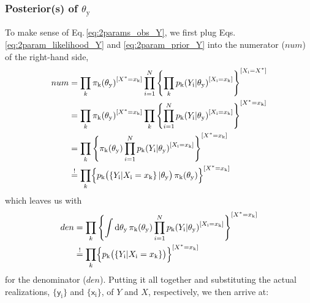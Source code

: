 \documentclass[]{report}
\begin{document}
\subsubsection{Posterior(s) of $\theta_\mathrm{y}$}
To make sense of Eq.\,\ref{eq:2params_obs_Y}, we first plug Eqs.\,\ref{eq:2param_likelihood_Y} and \ref{eq:2param_prior_Y} into the numerator ($num$) of the right-hand side,
\begin{align}
num 
&=
\prod_{k}
	{
		\pi_\mathrm{k}( \theta_\mathrm{y} )
	}
    ^
    {
		[ X^* = x_\mathrm{k} ]
	}
\prod_{i=1}^{N}
	\left\{
		\prod_{k}
			{
				p_\mathrm{k}( Y_\mathrm{i} | \theta_\mathrm{y} )
			}
		    ^
		    {
				[ X_\mathrm{i} = x_\mathrm{k} ]
			}
	\right\}
	^
	{
		[ X_\mathrm{i} = X^* ]
	}
\nonumber \\
&=
\prod_{k}
	{
		\pi_\mathrm{k}( \theta_\mathrm{y} )
	}
    ^
    {
		[ X^* = x_\mathrm{k} ]
	}
\prod_{k}
	\left\{
		\prod_{i=1}^{N}
			{
				p_\mathrm{k}( Y_\mathrm{i} | \theta_\mathrm{y} )
			}
			^
			{
				[ X_\mathrm{i} = x_\mathrm{k} ]
			}
	\right\}
	^
	{
		[ X^* = x_\mathrm{k} ]
	}
\nonumber \\
&=
\prod_{k}
	\left\{
		\pi_\mathrm{k}( \theta_\mathrm{y} )
		\prod_{i=1}^{N}
			{
				p_\mathrm{k}( Y_\mathrm{i} | \theta_\mathrm{y} )
			}
			^
			{
				[ X_\mathrm{i} = x_\mathrm{k} ]
			}
	\right\}
	^
	{
		[ X^* = x_\mathrm{k} ]
	}
\nonumber \\
&\stackrel{!}{=}
\prod_{k}
	\Bigl\{
		p_\mathrm{k}
			\bigl(
				\left\{ 
					Y_\mathrm{i} | 
					X_\mathrm{i} = x_\mathrm{k} 
				\right\} |
				\theta_\mathrm{y}
			\bigr) \,
		\pi_\mathrm{k}( \theta_\mathrm{y} )
	\Bigr\}
	^
	{
		[ X^* = x_\mathrm{k} ]
	}
\end{align}
which leaves us with
\begin{align}
den 
&= 
\prod_{k}
	\left\{
		\int \mathrm{d}\theta_\mathrm{y} \,
			\pi_\mathrm{k}( \theta_\mathrm{y} )
			\prod_{i=1}^{N}
				{
					p_\mathrm{k}( Y_\mathrm{i} | 
					\theta_\mathrm{y} )
				}
				^
				{
					[ X_\mathrm{i} = x_\mathrm{k} ]
				}
	\right\}
	^
	{
		[ X^* = x_\mathrm{k} ]
	} 
\nonumber \\
&\stackrel{!}{=}
\prod_{k}
	\Bigl\{
		p_\mathrm{k}
			\bigl(
				\left\{
					 Y_\mathrm{i} | 
					 X_\mathrm{i} = x_\mathrm{k} 
				\right\}
			\bigr)
	\Bigr\}
	^
	{
		[ X^* = x_\mathrm{k} ]
	}
\end{align}
for the denominator ($den$). Putting it all together and substituting the actual realizations, $ \{ \mathsf{y}_\mathrm{i} \} $ and $ \{ \mathsf{x}_\mathrm{i} \} $, of $Y$ and $X$, respectively, we then arrive at:
\end{document}
